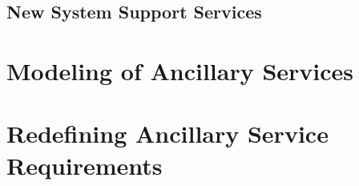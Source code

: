 \subsection{New System Support Services} %
\label{sub:newservices}

\section{Modeling of Ancillary Services} %
\label{sec:Modeling of Ancillary Services}


\section{Redefining Ancillary Service Requirements} %
\label{sec:Redefining Ancillary Service Requirements}



